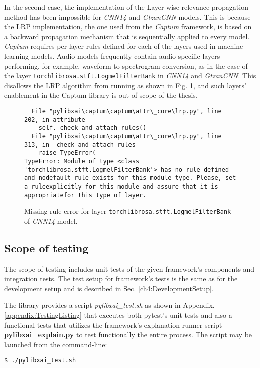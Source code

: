 \documentclass[
    bindingoffset=5mm,  %
    footnoteindent=3mm, %
    hyphenation=true    %
]{src/wut-thesis}
\begin{document}
In the second case, the implementation of the Layer-wise relevance propagation method has been impossible for
\emph{CNN14} and \emph{GtzanCNN} models. This is because the LRP implementation, the one used from the
\emph{Captum} framework, is based on a backward propagation mechanism that is sequentially applied to every
model. \emph{Captum} requires per-layer rules defined for each of the layers used in machine learning models.
Audio models frequently contain audio-specific layers performing, for example, waveform to spectrogram conversion,
as in the case of the layer \texttt{torchlibrosa.stft.LogmelFilterBank} in \emph{CNN14} and \emph{GtzanCNN}. 
This disallows the LRP algorithm from running as shown in Fig. \ref{fig:LrpMissingLayer},
and such layers’ enablement in the Captum library is out of scope of the thesis.

\begin{figure}%
\begin{verbatim}
  File "pylibxai\captum\captum\attr\_core\lrp.py", line 202, in attribute
    self._check_and_attach_rules()
  File "pylibxai\captum\captum\attr\_core\lrp.py", line 313, in _check_and_attach_rules
    raise TypeError(
TypeError: Module of type <class 'torchlibrosa.stft.LogmelFilterBank'> has no rule defined and nodefault rule exists for this module type. Please, set a ruleexplicitly for this module and assure that it is appropriatefor this type of layer.
\end{verbatim}
\caption{Missing rule error for layer \texttt{torchlibrosa.stft.LogmelFilterBank} of \emph{CNN14} model.}
\label{fig:LrpMissingLayer}
\end{figure}

\subsection{Scope of testing}

The scope of testing includes unit tests of the given framework's components and integration tests.
The test setup for framework's tests is the same as for the development setup and is described
in Sec. \ref{ch4:DevelopmentSetup}.

The library provides a script \emph{pylibxai\_test.sh} as shown in Appendix. \ref{appendix:TestingListing} that
executes both pytest's unit tests and also a functional tests
that utilizes the framework's explanation runner script \textbf{pylibxai\_explain.py} to
test functionally the entire process. The script may be launched from the command-line:
\begin{verbatim}
$ ./pylibxai_test.sh
\end{verbatim}
\end{document}

